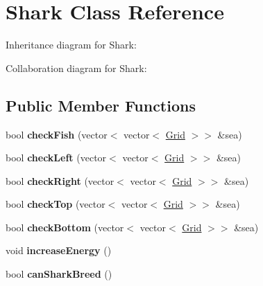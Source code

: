 \hypertarget{class_shark}{}\section{Shark Class Reference}
\label{class_shark}


Inheritance diagram for Shark\+:


Collaboration diagram for Shark\+:
\subsection*{Public Member Functions}
\begin{DoxyCompactItemize}
\item 
bool {\bfseries check\+Fish} (vector$<$ vector$<$ \hyperlink{class_grid}{Grid} $>$$>$ \&sea)\hypertarget{class_shark_a91d600be533f2be0d22c61a0b52adc10}{}\label{class_shark_a91d600be533f2be0d22c61a0b52adc10}

\item 
bool {\bfseries check\+Left} (vector$<$ vector$<$ \hyperlink{class_grid}{Grid} $>$$>$ \&sea)\hypertarget{class_shark_a00d02dcb14b8a512370aacd67c31705e}{}\label{class_shark_a00d02dcb14b8a512370aacd67c31705e}

\item 
bool {\bfseries check\+Right} (vector$<$ vector$<$ \hyperlink{class_grid}{Grid} $>$$>$ \&sea)\hypertarget{class_shark_a08749beb1c02dd9e88f0906d771e19f6}{}\label{class_shark_a08749beb1c02dd9e88f0906d771e19f6}

\item 
bool {\bfseries check\+Top} (vector$<$ vector$<$ \hyperlink{class_grid}{Grid} $>$$>$ \&sea)\hypertarget{class_shark_ab30fbc361f2c9f5ffcd387f6c3fcf6f7}{}\label{class_shark_ab30fbc361f2c9f5ffcd387f6c3fcf6f7}

\item 
bool {\bfseries check\+Bottom} (vector$<$ vector$<$ \hyperlink{class_grid}{Grid} $>$$>$ \&sea)\hypertarget{class_shark_a13b6a83e05b412c908d96b11e3bbdbde}{}\label{class_shark_a13b6a83e05b412c908d96b11e3bbdbde}

\item 
void {\bfseries increase\+Energy} ()\hypertarget{class_shark_aecb95d349679b4e0cc3cd4c2c5268f45}{}\label{class_shark_aecb95d349679b4e0cc3cd4c2c5268f45}

\item 
bool {\bfseries can\+Shark\+Breed} ()\hypertarget{class_shark_a7fa8378ea64fb0dc64473264400eabe6}{}\label{class_shark_a7fa8378ea64fb0dc64473264400eabe6}


\end{DoxyCompactItemize}
